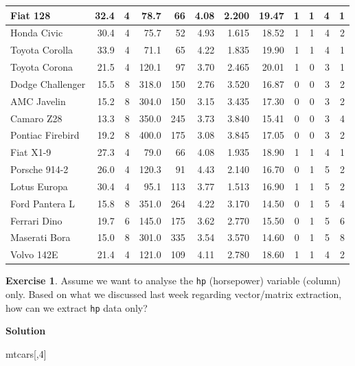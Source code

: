 \documentclass[
]{book}
\newenvironment{Shaded}{\begin{snugshade}}{\end{snugshade}}
\newcommand{\DecValTok}[1]{\textcolor[rgb]{0.00,0.00,0.81}{#1}}
\newcommand{\NormalTok}[1]{#1}
\theoremstyle{definition}
\theoremstyle{definition}
\theoremstyle{definition}
\newtheorem{exercise}{Exercise}[chapter]
\theoremstyle{definition}
\theoremstyle{remark}
\begin{document}
\begin{tabular}{l|r|r|r|r|r|r|r|r|r|r|r}
\hline
Fiat 128 & 32.4 & 4 & 78.7 & 66 & 4.08 & 2.200 & 19.47 & 1 & 1 & 4 & 1\\
\hline
Honda Civic & 30.4 & 4 & 75.7 & 52 & 4.93 & 1.615 & 18.52 & 1 & 1 & 4 & 2\\
\hline
Toyota Corolla & 33.9 & 4 & 71.1 & 65 & 4.22 & 1.835 & 19.90 & 1 & 1 & 4 & 1\\
\hline
Toyota Corona & 21.5 & 4 & 120.1 & 97 & 3.70 & 2.465 & 20.01 & 1 & 0 & 3 & 1\\
\hline
Dodge Challenger & 15.5 & 8 & 318.0 & 150 & 2.76 & 3.520 & 16.87 & 0 & 0 & 3 & 2\\
\hline
AMC Javelin & 15.2 & 8 & 304.0 & 150 & 3.15 & 3.435 & 17.30 & 0 & 0 & 3 & 2\\
\hline
Camaro Z28 & 13.3 & 8 & 350.0 & 245 & 3.73 & 3.840 & 15.41 & 0 & 0 & 3 & 4\\
\hline
Pontiac Firebird & 19.2 & 8 & 400.0 & 175 & 3.08 & 3.845 & 17.05 & 0 & 0 & 3 & 2\\
\hline
Fiat X1-9 & 27.3 & 4 & 79.0 & 66 & 4.08 & 1.935 & 18.90 & 1 & 1 & 4 & 1\\
\hline
Porsche 914-2 & 26.0 & 4 & 120.3 & 91 & 4.43 & 2.140 & 16.70 & 0 & 1 & 5 & 2\\
\hline
Lotus Europa & 30.4 & 4 & 95.1 & 113 & 3.77 & 1.513 & 16.90 & 1 & 1 & 5 & 2\\
\hline
Ford Pantera L & 15.8 & 8 & 351.0 & 264 & 4.22 & 3.170 & 14.50 & 0 & 1 & 5 & 4\\
\hline
Ferrari Dino & 19.7 & 6 & 145.0 & 175 & 3.62 & 2.770 & 15.50 & 0 & 1 & 5 & 6\\
\hline
Maserati Bora & 15.0 & 8 & 301.0 & 335 & 3.54 & 3.570 & 14.60 & 0 & 1 & 5 & 8\\
\hline
Volvo 142E & 21.4 & 4 & 121.0 & 109 & 4.11 & 2.780 & 18.60 & 1 & 1 & 4 & 2\\
\hline
\end{tabular}

\begin{exercise}
Assume we want to analyse the \texttt{hp} (horsepower) variable (column) only. Based on what we discussed last week regarding vector/matrix extraction, how can we extract \texttt{hp} data only?
\end{exercise}

\textbf{Solution}

\begin{Shaded}
\begin{Highlighting}[]
\NormalTok{mtcars[,}\DecValTok{4}\NormalTok{]}
\end{Highlighting}
\end{Shaded}
\end{document}
